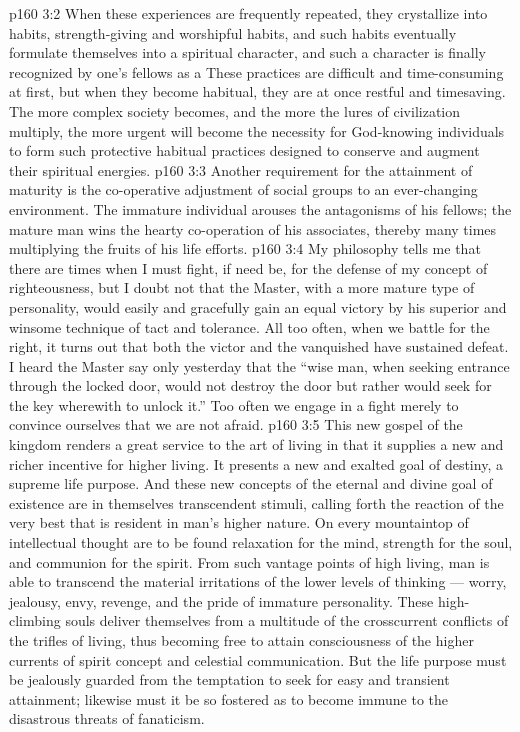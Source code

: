 \vs p160 3:2 When these experiences are frequently repeated, they crystallize into habits, strength\hyp{}giving and worshipful habits, and such habits eventually formulate themselves into a spiritual character, and such a character is finally recognized by one’s fellows as a  These practices are difficult and time\hyp{}consuming at first, but when they become habitual, they are at once restful and timesaving. The more complex society becomes, and the more the lures of civilization multiply, the more urgent will become the necessity for God\hyp{}knowing individuals to form such protective habitual practices designed to conserve and augment their spiritual energies.
\vs p160 3:3 Another requirement for the attainment of maturity is the co\hyp{}operative adjustment of social groups to an ever\hyp{}changing environment. The immature individual arouses the antagonisms of his fellows; the mature man wins the hearty co\hyp{}operation of his associates, thereby many times multiplying the fruits of his life efforts.
\vs p160 3:4 My philosophy tells me that there are times when I must fight, if need be, for the defense of my concept of righteousness, but I doubt not that the Master, with a more mature type of personality, would easily and gracefully gain an equal victory by his superior and winsome technique of tact and tolerance. All too often, when we battle for the right, it turns out that both the victor and the vanquished have sustained defeat. I heard the Master say only yesterday that the \textcolor{ubdarkred}{“wise man, when seeking entrance through the locked door, would not destroy the door but rather would seek for the key wherewith to unlock it.”} Too often we engage in a fight merely to convince ourselves that we are not afraid.
\vs p160 3:5 This new gospel of the kingdom renders a great service to the art of living in that it supplies a new and richer incentive for higher living. It presents a new and exalted goal of destiny, a supreme life purpose. And these new concepts of the eternal and divine goal of existence are in themselves transcendent stimuli, calling forth the reaction of the very best that is resident in man’s higher nature. On every mountaintop of intellectual thought are to be found relaxation for the mind, strength for the soul, and communion for the spirit. From such vantage points of high living, man is able to transcend the material irritations of the lower levels of thinking --- worry, jealousy, envy, revenge, and the pride of immature personality. These high\hyp{}climbing souls deliver themselves from a multitude of the crosscurrent conflicts of the trifles of living, thus becoming free to attain consciousness of the higher currents of spirit concept and celestial communication. But the life purpose must be jealously guarded from the temptation to seek for easy and transient attainment; likewise must it be so fostered as to become immune to the disastrous threats of fanaticism.
